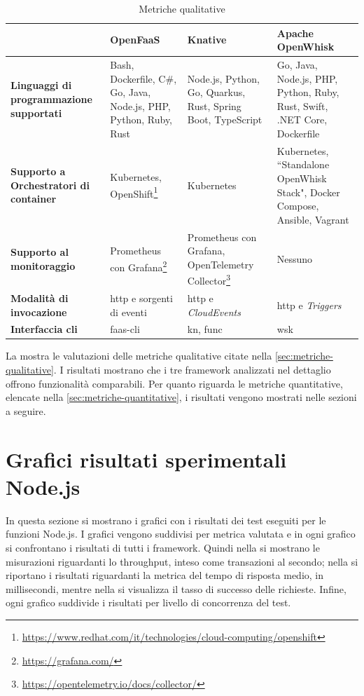 \documentclass[12pt,a4paper,openany,twoside]{book}
\begin{document}
\begin{table}
    \centering
    \begin{tabularx}{\linewidth} {
  | >{\centering\arraybackslash}X 
  | >{\centering\arraybackslash}X
  | >{\centering\arraybackslash}X
  | >{\centering\arraybackslash}X | }
        \hline
          &  \textbf{OpenFaaS} & \textbf{Knative} & \textbf{Apache OpenWhisk} \\ [0.8ex]
        \hline
        \textbf{Linguaggi di programmazione supportati} & Bash, Dockerfile, C\#, Go, Java, Node.js, PHP, Python, Ruby, Rust & Node.js, Python, Go, Quarkus, Rust, Spring Boot, TypeScript & Go, Java, Node.js, PHP, Python, Ruby, Rust, Swift, .NET Core, Dockerfile \\
        \hline
        \textbf{Supporto a Orchestratori di container} & Kubernetes, OpenShift\footnote{\url{https://www.redhat.com/it/technologies/cloud-computing/openshift}} & Kubernetes & Kubernetes, ``Standalone OpenWhisk Stack", Docker Compose, Ansible, Vagrant \\
        \hline
        \textbf{Supporto al monitoraggio} & Prometheus con Grafana\footnote{\url{https://grafana.com/}} & Prometheus con Grafana, OpenTelemetry Collector\footnote{\url{https://opentelemetry.io/docs/collector/}} & Nessuno \\
        \hline
        \textbf{Modalità di invocazione} & \ac{http} e sorgenti di eventi & \ac{http} e \textit{CloudEvents} & \ac{http} e \textit{Triggers} \\
        \hline
        \textbf{Interfaccia \ac{cli}} & faas-cli & kn, func & wsk \\
        \hline
    \end{tabularx}
    \caption{Metriche qualitative}
    \label{tab:tabella-metriche-qualitative}
\end{table}

La  mostra le valutazioni delle metriche qualitative citate nella \cref{sec:metriche-qualitative}. I risultati mostrano che i tre framework analizzati nel dettaglio offrono funzionalità comparabili. Per quanto riguarda le metriche quantitative, elencate nella \cref{sec:metriche-quantitative}, i risultati vengono mostrati nelle sezioni a seguire.

\section{Grafici risultati sperimentali Node.js}

In questa sezione si mostrano i grafici con i risultati dei test eseguiti per le funzioni Node.js. I grafici vengono suddivisi per metrica valutata e in ogni grafico si confrontano i risultati di tutti i framework. Quindi nella  si mostrano le misurazioni riguardanti lo throughput, inteso come transazioni al secondo; nella  si riportano i risultati riguardanti la metrica del tempo di risposta medio, in millisecondi, mentre nella  si visualizza il tasso di successo delle richieste. Infine, ogni grafico suddivide i risultati per livello di concorrenza del test.
\end{document}
